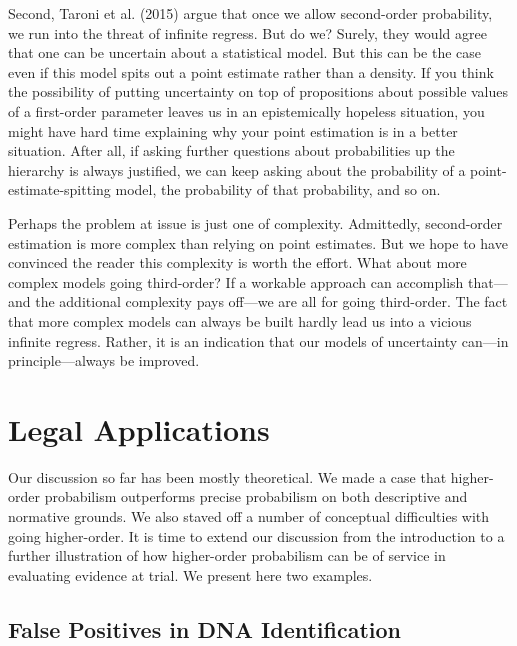 \documentclass[
  10pt,
  dvipsnames,enabledeprecatedfontcommands]{scrartcl}
\newcommand{\inbook}[1]{\todo[color=gray!40]{#1}}
\begin{document}

Second, Taroni et al. (2015) argue that once we allow second-order
probability, we run into the threat of infinite regress. But do we?
Surely, they would agree that one can be uncertain about a statistical
model. But this can be the case even if this model spits out a point
estimate rather than a density. If you think the possibility of putting
uncertainty on top of propositions about possible values of a
first-order parameter leaves us in an epistemically hopeless situation,
you might have hard time explaining why your point estimation is in a
better situation. After all, if asking further questions about
probabilities up the hierarchy is always justified, we can keep asking
about the probability of a point-estimate-spitting model, the
probability of that probability, and so on.

Perhaps the problem at issue is just one of complexity. Admittedly,
second-order estimation is more complex than relying on point estimates.
But we hope to have convinced the reader this complexity is worth the
effort. What about more complex models going third-order? If a workable
approach can accomplish that---and the additional complexity pays
off---we are all for going third-order. The fact that more complex
models can always be built hardly lead us into a vicious infinite
regress. Rather, it is an indication that our models of uncertainty
can---in principle---always be improved.

\hypertarget{legal-applications}{%
\section{Legal Applications}\label{legal-applications}}

\label{sec:legal-applications}

\inbook{Add carpet evidence in the Wayne Williams case}

Our discussion so far has been mostly theoretical. We made a case that
higher-order probabilism outperforms precise probabilism on both
descriptive and normative grounds. We also staved off a number of
conceptual difficulties with going higher-order. It is time to extend
our discussion from the introduction to a further illustration of how
higher-order probabilism can be of service in evaluating evidence at
trial. We present here two examples.

\hypertarget{false-positives-in-dna-identification}{%
\subsection{False Positives in DNA
Identification}\label{false-positives-in-dna-identification}}
\end{document}
